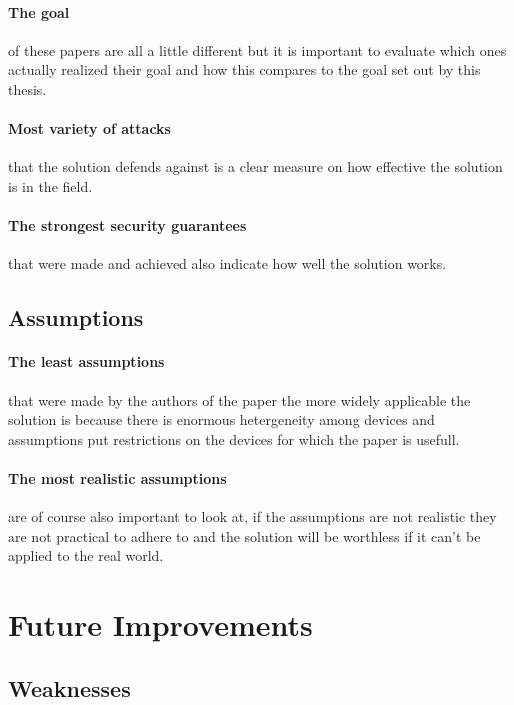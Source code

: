 \documentclass{report}
\begin{document}
\paragraph*{The goal}
of these papers are all a little different but it is important to evaluate which ones actually realized their goal and how this compares to the goal set out by this thesis.

\paragraph*{Most variety of attacks}
that the solution defends against is a clear measure on how effective the solution is in the field.

\paragraph*{The strongest security guarantees}
that were made and achieved also indicate how well the solution works.

\subsection*{Assumptions}

\paragraph*{The least assumptions}
that were made by the authors of the paper the more widely applicable the solution is because there is enormous hetergeneity among devices and assumptions put restrictions on the devices for which the paper is usefull.

\paragraph*{The most realistic assumptions}
are of course also important to look at, if the assumptions are not realistic they are not practical to adhere to and the solution will be worthless if it can't be applied to the real world.

\section{Future Improvements}

\subsection*{Weaknesses}
\end{document}
